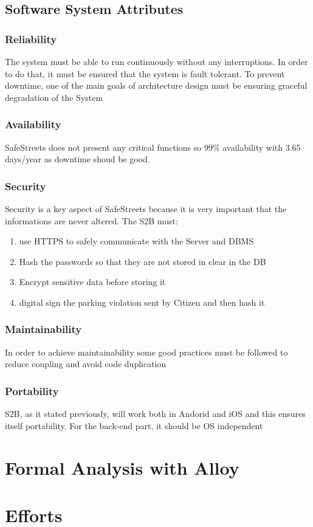 \documentclass{article}
\begin{document}
\subsection{Software System Attributes}
\subsubsection{Reliability}
The system must be able to run continuously without any interruptions. In order to do that, it must be ensured 
that the system is fault tolerant. To prevent downtime, one of the main goals of architecture design must be 
ensuring graceful degradation of the System
\subsubsection{Availability}
SafeStreets does not present any critical functions so 99\% availability with 3.65 days/year
as downtime shoud be good.  
\subsubsection{Security}
Security is a key aspect of SafeStreets because it is very important that the informations are never altered.
The S2B must:
\begin{enumerate}
 \item use HTTPS to safely communicate with the Server and DBMS    
 \item Hash the passwords so that they are not stored in clear in the DB
 \item Encrypt sensitive data before storing it
 \item digital sign the parking violation sent by Citizen and then hash it  
\end{enumerate} 
\subsubsection{Maintainability}
In order to achieve maintainability some good practices must be followed to reduce coupling and avoid code duplication 
\subsubsection{Portability}
S2B, as it stated previously, will work both in Andorid and iOS and this ensures itself portability. For 
the back-end part, it should be OS independent

\section{Formal Analysis with Alloy}

\section{Efforts}




    
\end{document}
